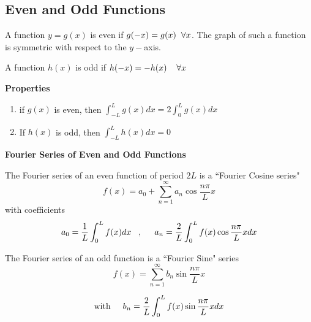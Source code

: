 \documentclass[11pt,a4paper]{article}
\theoremstyle{definition}
\newcommand{\subhead}[1]{%
  \par\medskip\noindent\textbf{#1}\par\nobreak\smallskip}
\begin{document}
{\color[wave]{485}\subsection{Even and Odd Functions}}
A function $y =  g(x)$ is even if $g(-x) = g(x)\hspace{0.2cm}\forall x$. The graph of such a function is symmetric with respect to the $y-$axis.


\begin{figure}[H]
\centering
{}
\end{figure}

A function $h(x)$ is odd if $h(-x) = -h(x)\hspace{0.4cm}\forall x$


\subhead{Properties}
\begin{enumerate}

\item if $g(x)$ is even, then
$\displaystyle{\int^L_{-L} g(x)dx = 2\int^L_0 g(x)dx }$

\item If $h(x)$ is odd, then 
$\displaystyle{\int^L_{-L} h(x)dx =0}$
\end{enumerate}

\subhead{Fourier Series of Even and Odd Functions}


The Fourier series of an even function of  period $2L$ is a ``Fourier Cosine series"
$$f(x) = a_0 + \sum^{\infty}_{n=1}a_n \cos \frac{n\pi}{L}x$$
with coefficients 
$$a_0 = \frac{1}{L}\int^L_0f(x)dx\hspace{0.3cm}, \hspace{0.5cm} a_n = \frac{2}{L}\int^L_0 f(x) \cos \frac{n\pi}{L}xdx$$


The Fourier series of an odd function is a ``Fourier Sine" series 
$$f(x) = \sum^{\infty}_{n=1}b_n \sin \frac{n\pi}{L}x$$ 

$$\text{with}\hspace{0.5cm} b_n = \frac{2}{L}\int^L_0 f(x) \sin \frac{n\pi}{L}xdx$$
\end{document}
